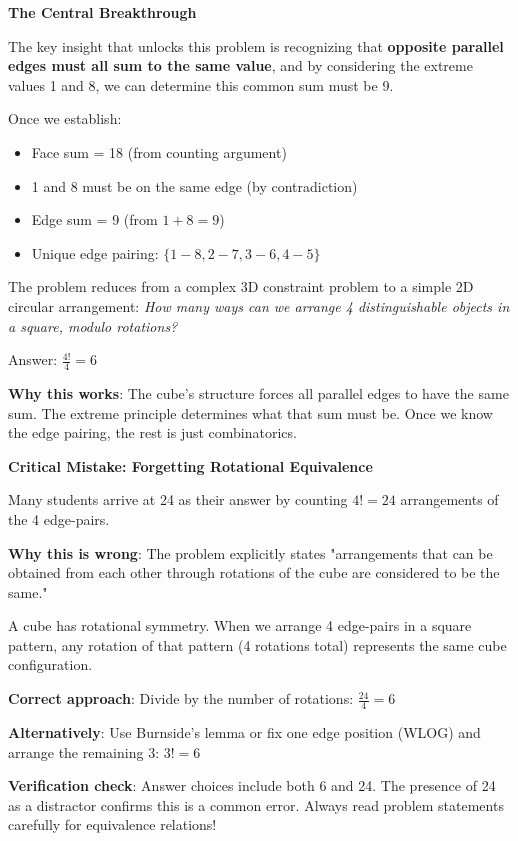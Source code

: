 \documentclass[]{article}
\begin{document}
\begin{keyinsightbox}
\textbf{The Central Breakthrough}

The key insight that unlocks this problem is recognizing that \textbf{opposite parallel edges must all sum to the same value}, and by considering the extreme values 1 and 8, we can determine this common sum must be 9.

Once we establish:
\begin{itemize}[nosep]
    \item Face sum = 18 (from counting argument)
    \item 1 and 8 must be on the same edge (by contradiction)
    \item Edge sum = 9 (from $1+8=9$)
    \item Unique edge pairing: $\{1-8, 2-7, 3-6, 4-5\}$
\end{itemize}

The problem reduces from a complex 3D constraint problem to a simple 2D circular arrangement: \textit{How many ways can we arrange 4 distinguishable objects in a square, modulo rotations?}

Answer: $\frac{4!}{4} = 6$

\textbf{Why this works}: The cube's structure forces all parallel edges to have the same sum. The extreme principle determines what that sum must be. Once we know the edge pairing, the rest is just combinatorics.
\end{keyinsightbox}

\begin{warningbox}
\textbf{Critical Mistake: Forgetting Rotational Equivalence}

Many students arrive at 24 as their answer by counting $4! = 24$ arrangements of the 4 edge-pairs.

\textbf{Why this is wrong}: The problem explicitly states "arrangements that can be obtained from each other through rotations of the cube are considered to be the same."

A cube has rotational symmetry. When we arrange 4 edge-pairs in a square pattern, any rotation of that pattern (4 rotations total) represents the same cube configuration.

\textbf{Correct approach}: Divide by the number of rotations: $\frac{24}{4} = 6$

\textbf{Alternatively}: Use Burnside's lemma or fix one edge position (WLOG) and arrange the remaining 3: $3! = 6$

\textbf{Verification check}: Answer choices include both 6 and 24. The presence of 24 as a distractor confirms this is a common error. Always read problem statements carefully for equivalence relations!
\end{warningbox}
\end{document}
